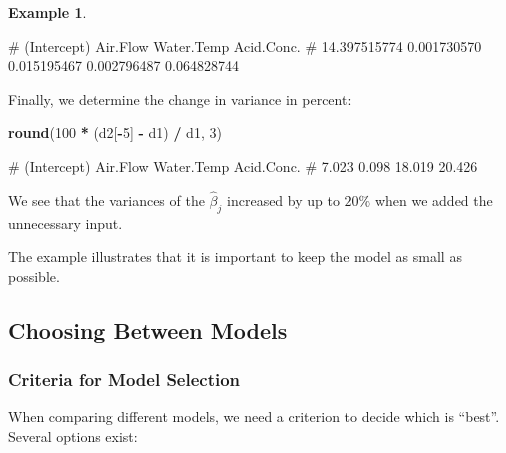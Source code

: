 \documentclass[
  a4paper,
]{article}
\newenvironment{Shaded}{\begin{snugshade}}{\end{snugshade}}
\newcommand{\DecValTok}[1]{\textcolor[rgb]{0.00,0.00,0.81}{#1}}
\newcommand{\FunctionTok}[1]{\textcolor[rgb]{0.13,0.29,0.53}{\textbf{#1}}}
\newcommand{\NormalTok}[1]{#1}
\newcommand{\SpecialCharTok}[1]{\textcolor[rgb]{0.81,0.36,0.00}{\textbf{#1}}}
\theoremstyle{definition}
\theoremstyle{definition}
\newtheorem{example}{Example}[section]
\theoremstyle{definition}
\theoremstyle{definition}
\theoremstyle{remark}
\begin{document}
\begin{example}
\begin{Shaded}
\begin{Highlighting}[]
\NormalTok{\#  (Intercept)     Air.Flow   Water.Temp   Acid.Conc.              }
\NormalTok{\# 14.397515774  0.001730570  0.015195467  0.002796487  0.064828744}
\end{Highlighting}
\end{Shaded}

Finally, we determine the change in variance in percent:

\begin{Shaded}
\begin{Highlighting}[]
\FunctionTok{round}\NormalTok{(}\DecValTok{100} \SpecialCharTok{*}\NormalTok{ (d2[}\SpecialCharTok{{-}}\DecValTok{5}\NormalTok{] }\SpecialCharTok{{-}}\NormalTok{ d1) }\SpecialCharTok{/}\NormalTok{ d1, }\DecValTok{3}\NormalTok{)}
\end{Highlighting}
\end{Shaded}

\begin{Shaded}
\begin{Highlighting}[]
\NormalTok{\# (Intercept)    Air.Flow  Water.Temp  Acid.Conc. }
\NormalTok{\#       7.023       0.098      18.019      20.426}
\end{Highlighting}
\end{Shaded}

We see that the variances of the \(\hat\beta_j\) increased by up to \(20\%\)
when we added the unnecessary input.
\end{example}

The example illustrates that it is important to keep the model as small
as possible.

\subsection{Choosing Between Models}\label{choosing-between-models}

\subsubsection{Criteria for Model Selection}\label{criteria-for-model-selection}

When comparing different models, we need a criterion to decide which
is ``best''. Several options exist:
\end{document}
